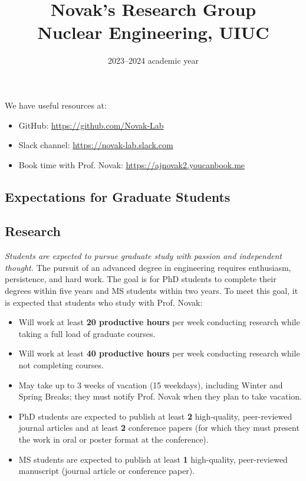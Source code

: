 \documentclass[12pt,twoside]{article}
\date{2023--2024 academic year}
\title{Novak's Research Group \\ Nuclear Engineering, UIUC}
\begin{document}
\maketitle

We have useful resources at:
\begin{itemize}
\item GitHub: \url{https://github.com/Novak-Lab}
\item Slack channel: \url{https://novak-lab.slack.com}
\item Book time with Prof. Novak: \url{https://ajnovak2.youcanbook.me}
\end{itemize}

\begin{center}
\section*{Expectations for Graduate Students}
\end{center}

\subsection*{Research}

\textit{Students are expected to pursue graduate study with passion and independent thought.} The pursuit of an advanced degree in engineering requires enthusiasm, persistence, and hard work. The goal is for PhD students to complete their degrees within five years and MS students within two years. To meet this goal, it is expected that students who study with Prof. Novak:
%
\begin{itemize}
\item Will work at least \textbf{20 productive hours} per week conducting research while taking a full load of graduate courses.
\item Will work at least \textbf{40 productive hours} per week conducting research while not completing courses.
\item May take up to 3 weeks of vacation (15 weekdays), including Winter and Spring Breaks; they must notify Prof. Novak when they plan to take vacation.
\item PhD students are expected to publish at least \textbf{2} high-quality, peer-reviewed journal articles and at least \textbf{2} conference papers (for which they must present the work in oral or poster format at the conference).
\item MS students are expected to publish at least \textbf{1} high-quality, peer-reviewed manuscript (journal article or conference paper).
\end{itemize}
\end{document}
